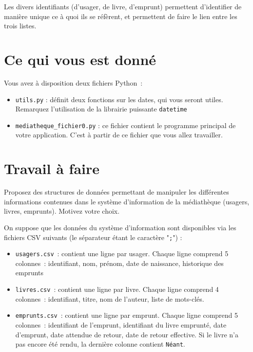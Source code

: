 \documentclass[10pt,a4paper]{sujets-exercices}
\begin{document}
Les divers identifiants (d'usager, de livre, d'emprunt) permettent d'identifier de manière unique ce à quoi ils se réfèrent, et permettent de faire le lien entre les trois listes. 

\section{Ce qui vous est donné}

Vous avez à disposition deux fichiers Python~:

\begin{itemize}
\item \texttt{utils.py} : définit deux fonctions sur les dates, qui vous seront utiles. Remarquez l'utilisation de la librairie puissante \texttt{datetime}
\item \texttt{mediatheque\_fichier0.py} : ce fichier contient le programme principal de votre application. C'est à partir de ce fichier que vous allez travailler. 
\end{itemize}

\section{Travail à faire}


Proposez des structures de données permettant de manipuler les différentes informations contenues dans le système d'information de la médiathèque (usagers, livres, emprunts). Motivez votre choix.


On suppose que les données du système d'information sont disponibles via les fichiers CSV suivants (le séparateur étant le caractère "\verb!;!") : 

\begin{itemize}
\item \texttt{usagers.csv}~: contient une ligne par usager. Chaque ligne comprend 5 colonnes~: identifiant, nom, prénom, date de naissance, historique des emprunts
\item \texttt{livres.csv}~: contient une ligne par livre. Chaque ligne comprend 4 colonnes~: identifiant, titre, nom de l'auteur, liste de mots-clés.
\item \texttt{emprunts.csv}~: contient une ligne par emprunt. Chaque ligne comprend 5 colonnes~: identifiant de l'emprunt, identifiant du livre emprunté, date d'emprunt, date attendue de retour, date de retour effective. Si le livre n'a pas encore été rendu, la dernière colonne contient \texttt{Néant}. 
\end{itemize}
\end{document}
